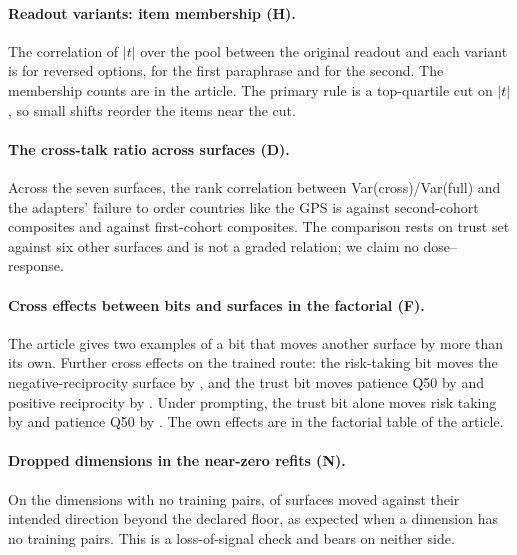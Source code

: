 \documentclass[12pt]{article}
\begin{document}
\paragraph{Readout variants: item membership (H).} The correlation of $|t|$ over the pool between the original readout and each variant is  for reversed options,  for the first paraphrase and  for the second. The membership counts are in the article. The primary rule is a top-quartile cut on $|t|$, so small shifts reorder the items near the cut.

\paragraph{The cross-talk ratio across surfaces (D).} Across the seven surfaces, the rank correlation between Var(cross)/Var(full) and the adapters' failure to order countries like the GPS is  against second-cohort composites and  against first-cohort composites. The comparison rests on trust set against six other surfaces and is not a graded relation; we claim no dose--response.

\paragraph{Cross effects between bits and surfaces in the factorial (F).} The article gives two examples of a bit that moves another surface by more than its own. Further cross effects on the trained route: the risk-taking bit moves the negative-reciprocity surface by , and the trust bit moves patience Q50 by  and positive reciprocity by . Under prompting, the trust bit alone moves risk taking by  and patience Q50 by . The own effects are in the factorial table of the article.

\paragraph{Dropped dimensions in the near-zero refits (N).} On the dimensions with no training pairs,  of  surfaces moved against their intended direction beyond the declared floor, as expected when a dimension has no training pairs. This is a loss-of-signal check and bears on neither side.
\end{document}
